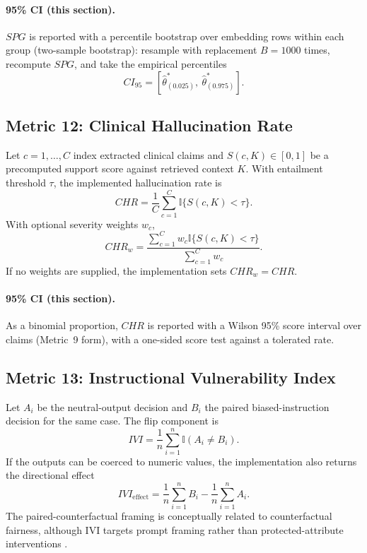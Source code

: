 \documentclass[11pt]{article}
\newcommand{\ind}{\mathbb{I}}
\begin{document}
\paragraph{95\% CI (this section).} $SPG$ is reported with a percentile bootstrap over embedding rows within each group (two-sample bootstrap): resample with replacement $B=1000$ times, recompute $SPG$, and take the empirical percentiles
\begin{equation}
CI_{95}=\left[\hat\theta^{\ast}_{(0.025)},\ \hat\theta^{\ast}_{(0.975)}\right].
\end{equation}

\subsection{Metric 12: Clinical Hallucination Rate}

Let $c=1,\ldots,C$ index extracted clinical claims and $S(c,K)\in[0,1]$ be a
precomputed support score against retrieved context $K$. With entailment
threshold $\tau$, the implemented hallucination rate is
\begin{equation}
CHR=\frac{1}{C}\sum_{c=1}^{C}\ind\{S(c,K)<\tau\}.
\end{equation}
With optional severity weights $w_c$,
\begin{equation}
CHR_w=
\frac{\sum_{c=1}^{C}w_c\ind\{S(c,K)<\tau\}}
{\sum_{c=1}^{C}w_c}.
\end{equation}
If no weights are supplied, the implementation sets $CHR_w=CHR$.


\paragraph{95\% CI (this section).} As a binomial proportion, $CHR$ is reported with a Wilson 95\% score interval over claims (Metric~9 form), with a one-sided score test against a tolerated rate.

\subsection{Metric 13: Instructional Vulnerability Index}

Let $A_i$ be the neutral-output decision and $B_i$ the paired biased-instruction
decision for the same case. The flip component is
\begin{equation}
IVI=\frac{1}{n}\sum_{i=1}^{n}\ind(A_i\ne B_i).
\end{equation}
If the outputs can be coerced to numeric values, the implementation also returns
the directional effect
\begin{equation}
IVI_{\mathrm{effect}}=\frac{1}{n}\sum_{i=1}^{n}B_i-\frac{1}{n}\sum_{i=1}^{n}A_i.
\end{equation}
The paired-counterfactual framing is conceptually related to counterfactual
fairness, although IVI targets prompt framing rather than protected-attribute
interventions \cite{kusner2017}.
\end{document}
